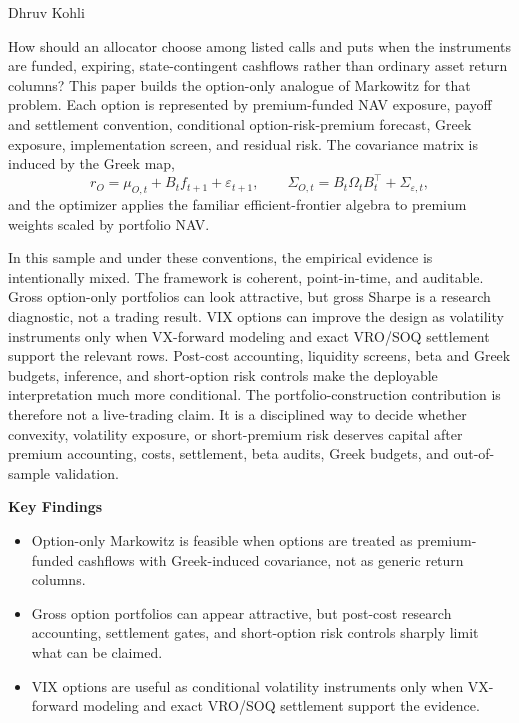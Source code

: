 \documentclass[11pt]{article}
\theoremstyle{definition}
\theoremstyle{remark}
\begin{document}
\thispagestyle{firstpage}

\vspace*{0.55cm}

\vspace{0.35cm}

\noindent Dhruv Kohli

\vspace{0.55cm}

How should an allocator choose among listed calls and puts when the instruments are funded,
expiring, state-contingent cashflows rather than ordinary asset return columns? This paper
builds the option-only analogue of Markowitz for that problem. Each option is represented
by premium-funded NAV exposure, payoff and settlement convention, conditional
option-risk-premium forecast, Greek exposure, implementation screen, and residual risk.
The covariance matrix is induced by the Greek map,
\[
  r_O=\mu_{O,t}+B_t f_{t+1}+\varepsilon_{t+1},\qquad
  \Sigma_{O,t}=B_t\Omega_tB_t^\top+\Sigma_{\varepsilon,t},
\]
and the optimizer applies the familiar efficient-frontier algebra to premium weights scaled
by portfolio NAV.

In this sample and under these conventions, the empirical evidence is intentionally mixed.
The framework is coherent, point-in-time, and auditable. Gross option-only portfolios can
look attractive, but gross Sharpe is a research diagnostic, not a trading result. VIX options
can improve the design as volatility instruments only when VX-forward modeling and exact
VRO/SOQ settlement support the relevant rows. Post-cost accounting, liquidity screens, beta
and Greek budgets, inference, and short-option risk controls make the deployable
interpretation much more conditional. The portfolio-construction contribution is therefore
not a live-trading claim. It is a disciplined way to decide whether convexity, volatility
exposure, or short-premium risk deserves capital after premium accounting, costs,
settlement, beta audits, Greek budgets, and out-of-sample validation.

\vspace{0.32cm}
\noindent\colorbox{impactshade}{%
  \begin{minipage}{0.94\textwidth}
  \textbf{\color{journalgreen} Key Findings}
  \begin{itemize}
    \item Option-only Markowitz is feasible when options are treated as premium-funded
    cashflows with Greek-induced covariance, not as generic return columns.
    \item Gross option portfolios can appear attractive, but post-cost research
    accounting, settlement gates, and short-option risk controls sharply limit what can be
    claimed.
    \item VIX options are useful as conditional volatility instruments only when
    VX-forward modeling and exact VRO/SOQ settlement support the evidence.
  \end{itemize}
  \end{minipage}}
\end{document}
